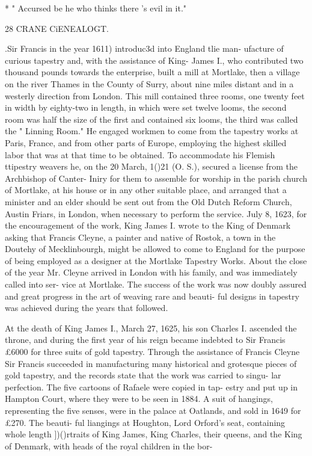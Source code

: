 \documentclass{book}
\begin{document}
* " Accursed be he who thinks there 's evil in it." 



28 CRANE CiENEALOGT. 

.Sir Francis in the year 1611) introduc3d into England tlie man- 
ufacture of curious tapestry and, with the assistance of King- 
James I., who contributed two thousand pounds towards the 
enterprise, built a mill at Mortlake, then a village on the river 
Thames in the County of Surry, about nine miles distant and in 
a westerly direction from London. This mill contained three 
rooms, one twenty feet in width by eighty-two in length, in which 
were set twelve looms, the second room was half the size of the 
first and contained six looms, the third was called the " Linning 
Room." He engaged workmen to come from the tapestry works 
at Paris, France, and from other parts of Europe, employing the 
highest skilled labor that was at that time to be obtained. To 
accommodate his Flemish ttipestry weavers he, on the 20 March, 
1()21 (O. S.), secured a license from the Archbishop of Canter- 
Iniry for them to assemble for worship in the parish church of 
Mortlake, at his house or in any other suitable place, and arranged 
that a minister and an elder should be sent out from the Old Dutch 
Reform Church, Austin Friars, in London, when necessary to 
perform the service. July 8, 1623, for the encouragement of the 
work, King James I. wrote to the King of Denmark asking that 
Francis Cleyne, a painter and native of Rostok, a town in the 
Doutehy of Mecklinbourgh, might be allowed to come to England 
for the purpose of being employed as a designer at the Mortlake 
Tapestry Works. About the close of the year Mr. Cleyne arrived 
in London with his family, and was immediately called into ser- 
vice at Mortlake. The success of the work was now doubly 
assured and great progress in the art of weaving rare and beauti- 
ful designs in tapestry was achieved during the years that followed. 

At the death of King James I., March 27, 1625, his son Charles 
I. ascended the throne, and during the first year of his reign became 
indebted to Sir Francis £6000 for three suits of gold tapestry. 
Through the assistance of Francis Cleyne Sir Francis succeeded 
in manufacturing many historical and grotesque pieces of gold 
tapestry, and the records state that the work was carried to singu- 
lar perfection. The five cartoons of Rafaele were copied in tap- 
estry and put up in Hampton Court, where they were to be seen 
in 1884. A suit of hangings, representing the five senses, were 
in the palace at Oatlands, and sold in 1649 for £270. The beauti- 
ful liangings at Houghton, Lord Orford's seat, containing whole 
length ])()rtraits of King James, King Charles, their queens, and 
the King of Denmark, with heads of the royal children in the bor- 
\end{document}
